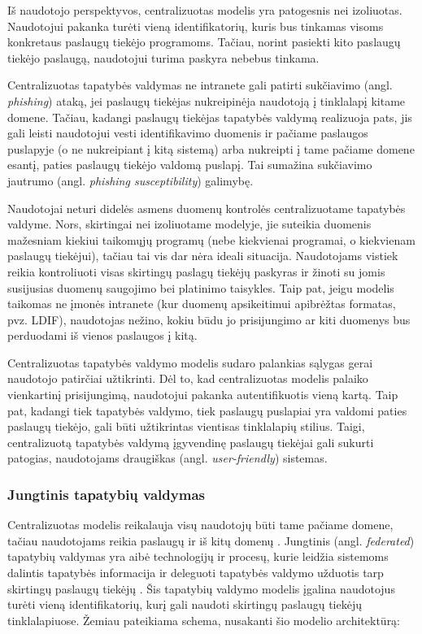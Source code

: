  
Iš naudotojo perspektyvos, centralizuotas modelis yra patogesnis nei izoliuotas. Naudotojui pakanka turėti vieną identifikatorių,
kuris bus tinkamas visoms konkretaus paslaugų tiekėjo programoms. Tačiau, norint pasiekti kito paslaugų tiekėjo paslaugą,
naudotojui turima paskyra nebebus tinkama.

Centralizuotas tapatybės valdymas ne intranete gali patirti sukčiavimo (angl. \textit{phishing}) ataką, jei paslaugų tiekėjas nukreipinėja naudotoją į tinklalapį kitame domene. Tačiau,
kadangi paslaugų tiekėjas tapatybės valdymą realizuoja pats, jis gali leisti naudotojui vesti identifikavimo duomenis ir pačiame paslaugos puslapyje (o ne nukreipiant
į kitą sistemą) arba nukreipti į tame pačiame domene esantį, paties paslaugų tiekėjo valdomą puslapį. Tai sumažina sukčiavimo jautrumo (angl. \textit{phishing susceptibility}) galimybę.

Naudotojai neturi didelės asmens duomenų kontrolės centralizuotame tapatybės valdyme. Nors, skirtingai nei izoliuotame modelyje, jie suteikia duomenis mažesniam kiekiui taikomųjų programų
(nebe kiekvienai programai, o kiekvienam paslaugų tiekėjui), tačiau tai vis dar nėra ideali situacija. Naudotojams vistiek reikia kontroliuoti
visas skirtingų paslagų tiekėjų paskyras ir žinoti su jomis susijusias duomenų saugojimo bei platinimo taisykles. Taip pat, jeigu modelis taikomas ne įmonės intranete (kur
duomenų apsikeitimui apibrėžtas formatas, pvz. LDIF), naudotojas nežino, kokiu būdu jo prisijungimo ar kiti duomenys bus perduodami iš vienos paslaugos į kitą.

Centralizuotas tapatybės valdymo modelis sudaro palankias sąlygas gerai naudotojo patirčiai užtikrinti. Dėl to, kad centralizuotas modelis palaiko vienkartinį prisijungimą,
naudotojui pakanka autentifikuotis vieną kartą. Taip pat, kadangi
tiek tapatybės valdymo, tiek paslaugų puslapiai yra valdomi paties paslaugų tiekėjo, gali būti užtikrintas vientisas tinklalapių stilius. Taigi, centralizuotą tapatybės valdymą
įgyvendinę paslaugų tiekėjai gali sukurti patogias, naudotojams draugiškas (angl. \textit{user-friendly}) sistemas.

\subsubsection{Jungtinis tapatybių valdymas}



Centralizuotas modelis reikalauja visų naudotojų būti tame pačiame domene, tačiau naudotojams reikia
paslaugų ir iš kitų domenų \cite{Cao2010}. Jungtinis (angl. \textit{federated}) tapatybių valdymas yra aibė technologijų
ir procesų, kurie leidžia sistemoms dalintis tapatybės informacija ir deleguoti tapatybės valdymo užduotis
tarp skirtingų paslaugų tiekėjų \cite{Maler2008}. Šis tapatybių valdymo modelis įgalina naudotojus turėti vieną
identifikatorių, kurį gali naudoti skirtingų paslaugų tiekėjų tinklalapiuose. Žemiau pateikiama schema, nusakanti
šio modelio architektūrą:

